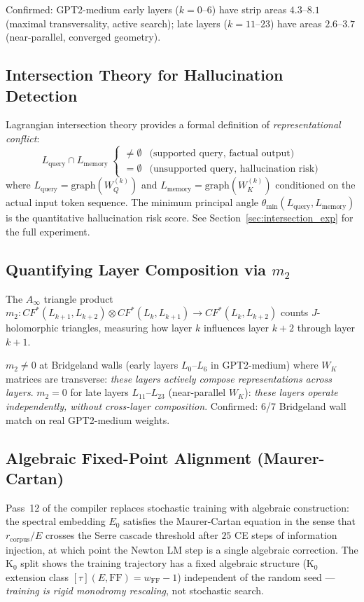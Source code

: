 \documentclass[11pt]{amsart}
\begin{document}
Confirmed: GPT2-medium early layers ($k=0$--$6$) have strip areas
$4.3$--$8.1$ (maximal transversality, active search);
late layers ($k=11$--$23$) have areas $2.6$--$3.7$
(near-parallel, converged geometry).

\subsection{Intersection Theory for Hallucination Detection}

Lagrangian intersection theory provides a formal definition of
\emph{representational conflict}:
\[
  L_\text{query} \cap L_\text{memory} \;
  \begin{cases} \neq \emptyset & \text{(supported query, factual output)} \\
  = \emptyset & \text{(unsupported query, hallucination risk)} \end{cases}
\]
where $L_\text{query} = \mathrm{graph}(W_Q^{(k)})$ and
$L_\text{memory} = \mathrm{graph}(W_K^{(k)})$ conditioned on
the actual input token sequence.
The minimum principal angle $\theta_\mathrm{min}(L_\text{query}, L_\text{memory})$
is the quantitative hallucination risk score.
See Section~\ref{sec:intersection_exp} for the full experiment.

\subsection{Quantifying Layer Composition via $m_2$}

The $A_\infty$ triangle product
$m_2: CF^{*}(L_{k+1},L_{k+2})\otimes CF^{*}(L_k,L_{k+1}) \to CF^{*}(L_k,L_{k+2})$
counts $J$-holomorphic triangles, measuring how layer $k$ influences
layer $k+2$ through layer $k+1$.

$m_2 \neq 0$ at Bridgeland walls (early layers $L_0$--$L_6$ in GPT2-medium)
where $W_K$ matrices are transverse: \emph{these layers actively compose
representations across layers}.
$m_2 = 0$ for late layers $L_{11}$--$L_{23}$ (near-parallel $W_K$):
\emph{these layers operate independently, without cross-layer composition}.
Confirmed: 6/7 Bridgeland wall match on real GPT2-medium weights.

\subsection{Algebraic Fixed-Point Alignment (Maurer-Cartan)}

Pass~12 of the compiler replaces stochastic training with
algebraic construction: the spectral embedding $E_0$ satisfies
the Maurer-Cartan equation in the sense that
$r_\mathrm{corpus}/E$ crosses the Serre cascade threshold after
$25$ CE steps of information injection,
at which point the Newton LM step is a single algebraic correction.
The K$_0$ split shows the training trajectory has a fixed algebraic
structure (K$_0$ extension class $[\tau](E,\mathrm{FF}) = w_\mathrm{FF}-1$)
independent of the random seed --- \emph{training is rigid monodromy
rescaling}, not stochastic search.
\end{document}
